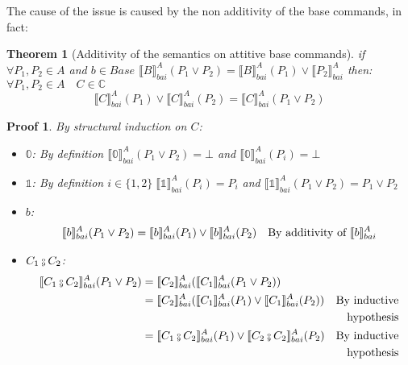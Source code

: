 \documentclass{article}
\newtheorem{theorem}{Theorem}
\newtheorem{proofs}{Proof}
\newcommand*{\sem}[1]{
    \llbracket #1 \rrbracket
}
\newcommand{\bca}[2]{
    #2_{bai}^{#1}
}
\newcommand{\bsem}[2][A]{
    \bca{#1}{\sem{#2}}
}
\def\fcmp{\mathbin{\raise 0.6ex\hbox{\oalign{\hfil$\scriptscriptstyle      
    \mathrm{o}$\hfil\cr\hfil$\scriptscriptstyle\mathrm{9}$\hfil}}}}
\def\lang{\mathbb{C}}
\begin{document}
    The cause of the issue is caused by the non additivity of the base commands,
    in fact:
    \label{thm:add}
    \begin{theorem}[Additivity of the semantics on attitive base commands]
        if $\forall P_1, P_2 \in A$ and $b \in Base$ $\bsem{B}(P_1 \lor P_2)
        = \bsem{B}(P_1) \lor \bsem{P_2}$ then:
        $\forall P_1, P_2 \in A \quad C \in \lang$
        $$\bsem{C}(P_1) \lor \bsem{C}(P_2) = \bsem{C}(P_1 \lor P_2)$$
    \end{theorem}
    \begin{proofs}
        By structural induction on $C$:
        \begin{itemize}
            \item $\mathbb{0}$:
                By definition $\bsem{\mathbb{0}}(P_1 \lor P_2) = \bot$
                and $\bsem{\mathbb{0}}(P_i) = \bot$

            \item $\mathbb{1}$:
                By definition $i \in \{1, 2\} \; \bsem{\mathbb{1}}(P_i) = P_i$
                and $\bsem{\mathbb{1}}(P_1 \lor P_2) = P_1 \lor P_2$

            \item $b$:
                \begin{align*}
                    \bsem{b}(P_1 \lor P_2)
                        &= \bsem{b}(P_1) \lor \bsem{b}(P_2)
                        &\text{By additivity of $\bsem{b}$} \\
                \end{align*}

            \item $C_1 \fcmp C_2$:
                \begin{align*}
                    \bsem{C_1 \fcmp C_2}(P_1 \lor P_2)
                        &= \bsem{C_2}(\bsem{C_1}(P_1 \lor P_2)) \\
                        &= \bsem{C_2}(\bsem{C_1}(P_1) \lor \bsem{C_1}(P_2))
                        &\text{By inductive} \\
                        &&\text{hypothesis} \\
                        &= \bsem{C_1 \fcmp C_2}(P_1) 
                            \lor \bsem{C_2 \fcmp C_2}(P_2)
                        &\text{By inductive} \\ && \text{hypothesis} \\
                \end{align*}


\end{itemize}
\end{proofs}
\end{document}
